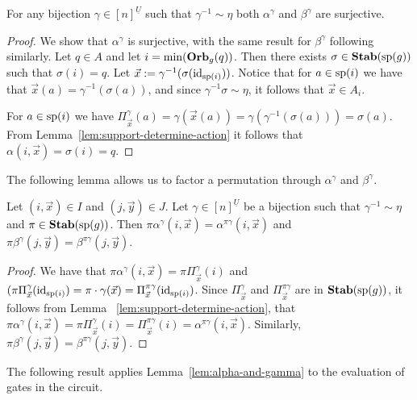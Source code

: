 \documentclass[../main/thesis.tex]{subfiles}
\begin{document}
\begin{lem} 
	For any bijection $\gamma \in [n]^{\underline{U}}$ such that $\gamma^{-1} \sim
  \eta$ both $\alpha^{\gamma}$ and $\beta^{\gamma}$ are surjective.
  \label{lem:alpha-beta-surjective}
\end{lem}
\begin{proof}
	We show that $\alpha^{\gamma}$ is surjective, with the same result for
  $\beta^{\gamma}$ following similarly. Let $q \in A$ and let $i = \min
  (\text{\textbf{Orb}}_{g} (q))$. Then there exists $\sigma \in \text{\textbf{Stab}} (\text{sp} (g))$ such that $\sigma
  (i) = q$. Let $\vec{x} := \gamma^{-1} (\sigma (\operatorname{id}_{\text{sp}(i)}))$. Notice that
  for $a \in \text{sp}(i)$ we have that $\vec{x}(a) = \gamma^{-1} (\sigma (a))$,
  and since $\gamma^{-1} \sigma \sim \eta$, it follows that $\vec{x} \in A_i$.
		
	For $a \in \text{sp}(i)$ we have $\Pi^{\gamma}_{\vec{x}} (a) = \gamma
  (\vec{x}(a)) = \gamma (\gamma^{-1} (\sigma (a))) = \sigma (a)$. From
  Lemma~\ref{lem:support-determine-action} it follows that $\alpha(i, \vec{x}) =
  \sigma(i) = q$.
\end{proof}

The following lemma allows us to factor a permutation through $\alpha^{\gamma}$
and $\beta^{\gamma}$.

\begin{lem}
  \label{lem:alpha-and-gamma}
	Let $(i,\vec{x}) \in I$ and $(j, \vec{y}) \in J$. Let $\gamma \in
  [n]^{\underline{U}}$ be a bijection such that $\gamma^{-1} \sim \eta$ and $\pi
  \in \text{\textbf{Stab}} (\text{sp} (g))$. Then $\pi \alpha^{\gamma}(i, \vec{x}) = \alpha^{\pi
    \gamma}(i, \vec{x})$ and $\pi \beta^{\gamma}(j, \vec{y}) = \beta^{\pi
    \gamma}(j, \vec{y})$.
\end{lem}
\begin{proof}
	We have that $\pi \alpha^{\gamma}(i, \vec{x}) = \pi \Pi^{\gamma}_{\vec{x}}(i)$
  and $(\pi \Pi^{\gamma}_{\vec{x}}(\operatorname{id}_{\text{sp}(i)}) = \pi \cdot \gamma (\vec{x})
  = \Pi^{\pi \gamma}_{\vec{x}}(\operatorname{id}_{\text{sp}(i)})$. Since $\Pi^{\gamma}_{\vec{x}}$
  and $\Pi^{\pi \gamma}_{\vec{x}}$ are in $\text{\textbf{Stab}} (\text{sp} (g))$, it follows from Lemma
  ~\ref{lem:support-determine-action}, that $\pi \alpha^{\gamma}(i, \vec{x}) =
  \pi \Pi^{\gamma}_{\vec{x}} (i) = \Pi^{\pi \gamma}_{\vec{x}}(i) = \alpha^{\pi
    \gamma}(i, \vec{x})$. Similarly, $\pi \beta^{\gamma}(j, \vec{y}) =
  \beta^{\pi \gamma} (j, \vec{y})$.
\end{proof}

The following result applies Lemma~\ref{lem:alpha-and-gamma} to the evaluation
of gates in the circuit.
\end{document}
